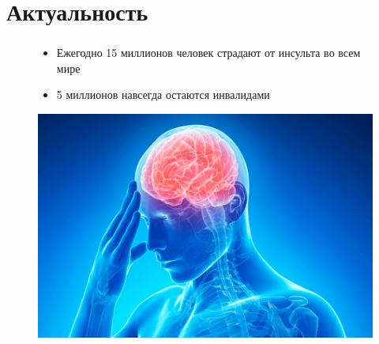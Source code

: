 \section{Актуальность}

\begin{frame}
\frametitle{\insertsection} 
\framesubtitle{\insertsubsection}

\begin{figure}[h]
    \begin{center}
        \begin{minipage}[h]{0.5\linewidth}
            \begin{itemize}
                \item 	Ежегодно 15 миллионов человек страдают от инсульта во всем мире
                \item 	5 миллионов навсегда остаются инвалидами
            \end{itemize}
        \end{minipage}
        \hfill 
        \begin{minipage}[h]{0.4\linewidth}
            \includegraphics[width=\linewidth]{1.jpg}
        \end{minipage}
    \end{center}
\end{figure}

\end{frame}